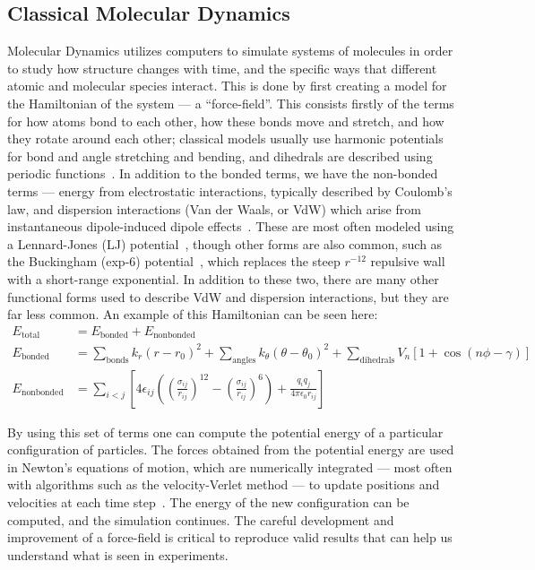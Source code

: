 \subsection{Classical Molecular Dynamics}
Molecular Dynamics utilizes computers to simulate systems of molecules in order to study how structure changes
with time, and the specific ways that different atomic and molecular species interact. This is done
by first creating a model for the Hamiltonian of the system --- a ``force-field''. This consists firstly of the terms for how atoms
bond to each other, how these bonds move and stretch, and how they rotate around each other; classical models
usually use harmonic potentials for bond and angle stretching and bending, and dihedrals 
are described using periodic functions~\cite{gromacsmanual}.
In addition to the bonded terms, we have the non-bonded terms — energy from 
electrostatic interactions, typically described by Coulomb's law, and dispersion 
interactions (Van der Waals, or VdW) which arise from instantaneous dipole-induced dipole effects~\cite{gromacsmanual}. These are 
most often modeled using a Lennard-Jones (LJ) potential~\cite{Jones:1924,gromacsmanual}, though other forms are 
also common, such as the Buckingham (exp-6) potential~\cite{Buckingham:1938,gromacsmanual}, which replaces the steep 
\(r^{-12}\) repulsive wall with a short-range exponential. In addition to these two, there are many other
functional forms used to describe VdW and dispersion interactions, but they are far less common. An example of this Hamiltonian
can be seen here:
\begin{align}
E_{\mathrm{total}} &= E_{\mathrm{bonded}} + E_{\mathrm{nonbonded}} \\
E_{\mathrm{bonded}} &= \sum_{\text{bonds}} k_r (r - r_0)^2
+ \sum_{\text{angles}} k_\theta (\theta - \theta_0)^2
+ \sum_{\text{dihedrals}} V_n \left[ 1 + \cos\left( n\phi - \gamma \right) \right] \\
E_{\mathrm{nonbonded}} &= \sum_{i<j} \left[ 4\epsilon_{ij} \left( \left( \frac{\sigma_{ij}}{r_{ij}} \right)^{12}
- \left( \frac{\sigma_{ij}}{r_{ij}} \right)^{6} \right)
+ \frac{q_i q_j}{4\pi\epsilon_0 r_{ij}} \right]
\end{align}

By using this set of terms one can compute the potential energy of a particular configuration of particles. 
The forces obtained from the potential energy are used in Newton's equations of motion, 
which are numerically integrated — most often with algorithms such as the velocity-Verlet method — 
to update positions and velocities at each time step~\cite{gromacsmanual}.
The energy of the new configuration
can be computed, and the simulation continues. The careful development and improvement of a force-field is critical to 
reproduce valid results that can help us understand what is seen in experiments.

